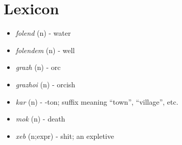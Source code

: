 \documentclass[main.tex]{subfiles}
\newcommand{\lexitem}[3]{\item \textit{#1} (#2) - #3}
\begin{document}
\section{Lexicon}
\begin{itemize}
    \lexitem{folend}{n}{water}
    \lexitem{folendem}{n}{well}
    \lexitem{grazh}{n}{orc}
    \lexitem{grazhoi}{n}{orcish}
    \lexitem{kar}{n}{-ton; suffix meaning ``town'', ``village'', etc.}
    \lexitem{mok}{n}{death}
    \lexitem{xeb}{n;expr}{shit; an expletive}
\end{itemize}
\end{document}
